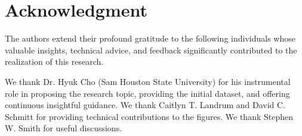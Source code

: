 \documentclass[conference]{IEEEtran}
\begin{document}
\section{Acknowledgment}

The authors extend their profound gratitude to the following individuals whose valuable insights, technical advice, and feedback significantly contributed to the realization of this research. 

We thank Dr. Hyuk Cho (Sam Houston State University) for his instrumental role in proposing the research topic, providing the initial dataset, and offering continuous insightful guidance. We thank Caitlyn T. Landrum and David C. Schmitt for providing technical contributions to the figures. We thank Stephen W. Smith for useful discussions.


%
\end{document}
